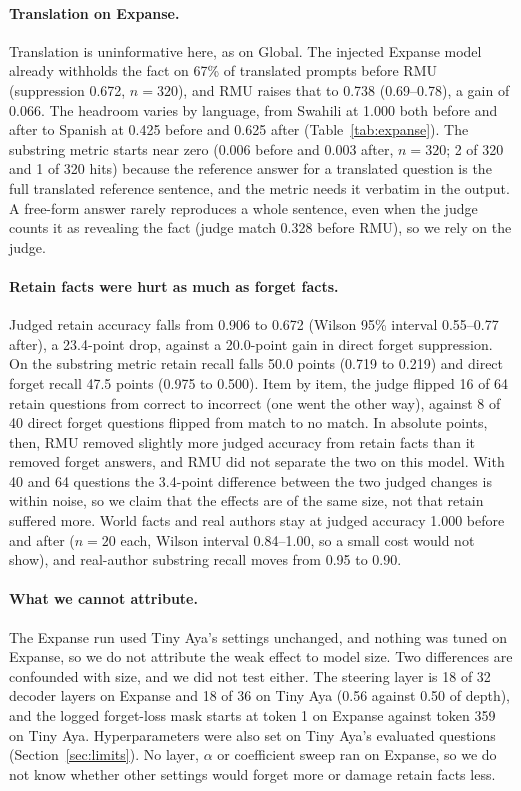 \documentclass[10pt,twocolumn]{article}
\begin{document}
\paragraph{Translation on Expanse.} Translation is uninformative here, as on Global. The injected Expanse model already withholds the fact on 67\% of translated prompts before RMU (suppression 0.672, $n=320$), and RMU raises that to 0.738 (0.69--0.78), a gain of 0.066. The headroom varies by language, from Swahili at 1.000 both before and after to Spanish at 0.425 before and 0.625 after (Table~\ref{tab:expanse}). The substring metric starts near zero (0.006 before and 0.003 after, $n=320$; 2 of 320 and 1 of 320 hits) because the reference answer for a translated question is the full translated reference sentence, and the metric needs it verbatim in the output. A free-form answer rarely reproduces a whole sentence, even when the judge counts it as revealing the fact (judge match 0.328 before RMU), so we rely on the judge.

\paragraph{Retain facts were hurt as much as forget facts.} Judged retain accuracy falls from 0.906 to 0.672 (Wilson 95\% interval 0.55--0.77 after), a 23.4-point drop, against a 20.0-point gain in direct forget suppression. On the substring metric retain recall falls 50.0 points (0.719 to 0.219) and direct forget recall 47.5 points (0.975 to 0.500). Item by item, the judge flipped 16 of 64 retain questions from correct to incorrect (one went the other way), against 8 of 40 direct forget questions flipped from match to no match. In absolute points, then, RMU removed slightly more judged accuracy from retain facts than it removed forget answers, and RMU did not separate the two on this model. With 40 and 64 questions the 3.4-point difference between the two judged changes is within noise, so we claim that the effects are of the same size, not that retain suffered more. World facts and real authors stay at judged accuracy 1.000 before and after ($n=20$ each, Wilson interval 0.84--1.00, so a small cost would not show), and real-author substring recall moves from 0.95 to 0.90.

\paragraph{What we cannot attribute.} The Expanse run used Tiny Aya's settings unchanged, and nothing was tuned on Expanse, so we do not attribute the weak effect to model size. Two differences are confounded with size, and we did not test either. The steering layer is 18 of 32 decoder layers on Expanse and 18 of 36 on Tiny Aya (0.56 against 0.50 of depth), and the logged forget-loss mask starts at token 1 on Expanse against token 359 on Tiny Aya. Hyperparameters were also set on Tiny Aya's evaluated questions (Section~\ref{sec:limits}). No layer, $\alpha$ or coefficient sweep ran on Expanse, so we do not know whether other settings would forget more or damage retain facts less.
\end{document}
